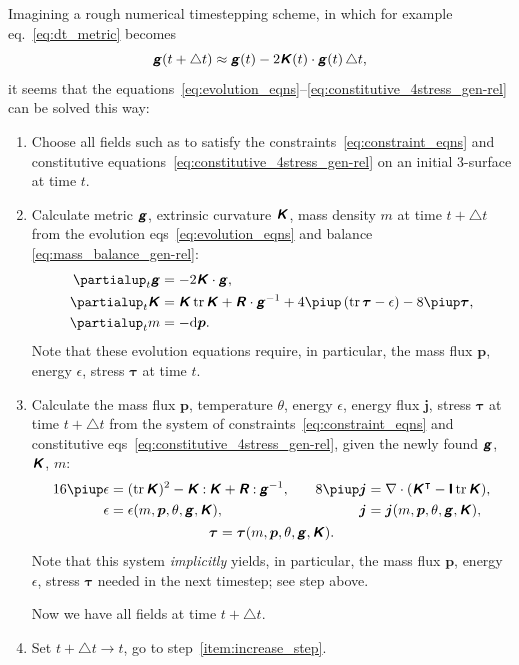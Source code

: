 \documentclass[\ifafour a4paper,12pt,\else a5paper,10pt,\fi%
onecolumn,oneside,article,%
british%
]{memoir}
\theoremstyle{remark}
\theoremstyle{innote}
\newcommand*{\mathte}[1]{\textbf{\textit{\textsf{#1}}}}
\newcommand*{\de}{\partialup}%
\newcommand*{\pu}{\piup}%
\newcommand*{\di}{\mathrm{d}}%
\DeclareMathOperator{\tr}{tr}%
\newcommand*{\incr}{\triangle}%
\newcommand*{\con}{\mathbin{:}}%
\renewcommand*{\|}{\nonscript\,\vert\nonscript\;\mathopen{}}
\newcommand*{\eqn}{eq.}%
\newcommand*{\eqns}{eqs}%
\newcommand*{\T}{^\intercal}%
\newcommand*{\ydd}{m}
\newcommand*{\yd}{\ydd}
\newcommand*{\yjj}{p}
\newcommand*{\yj}{\bm{\yjj}}
\newcommand*{\yTT}{\tau}
\newcommand*{\yT}{\bm{\yTT}}
\newcommand*{\ygg}{g}
\newcommand*{\yg}{\mathte{\ygg}}
\newcommand*{\yKK}{K}
\newcommand*{\yK}{\mathte{\yKK}}
\newcommand*{\yRR}{R}
\newcommand*{\yR}{\mathte{\yRR}}
\newcommand*{\ypp}{j}
\newcommand*{\yp}{\bm{\ypp}}
\newcommand*{\ye}{\epsilon}
\newcommand*{\yte}{\theta}
\newcommand*{\ynab}{\nabla}
\newcommand*{\yto}{t}
\newcommand*{\yI}{\textsf{\textbf{I}}}
\begin{document}
Imagining a rough numerical timestepping scheme, in which for example
\eqn~\eqref{eq:dt_metric} becomes
\begin{equation}
  \label{eq:approx_timestepping_dt_metric}
  \yg(t + \incr t) \approx \yg(t) -2\yK(t)\cdot\yg(t)\,\incr t,
\end{equation}
it seems that the
equations~\eqref{eq:evolution_eqns}--\eqref{eq:constitutive_4stress_gen-rel}
can be solved this way:
\begin{enumerate}[leftmargin=1.5\parindent]
\item Choose all fields such as to satisfy the
  constraints~\eqref{eq:constraint_eqns} and constitutive
  equations~\eqref{eq:constitutive_4stress_gen-rel} on an initial 3-surface
  at time $\yto$.
\item\label{item:increase_step}Calculate metric $\yg$, extrinsic curvature
  $\yK$, mass density $\yd$ at time $\yto + \incr t$ from the evolution
  \eqns~\eqref{eq:evolution_eqns} and balance
  \eqref{eq:mass_balance_gen-rel}:
  \begin{align*}
    \de_t \yg &= -2\yK\cdot\yg,
    \\
    \de_t \yK &=  \yK\tr\yK + \yR\cdot\yg^{-1} + 4\pu\,(\tr\yT-\ye) - 8\pu\yT,
    \\
    \de_t\yd &= - \di\yj.
  \end{align*}
  Note that these evolution equations require, in particular, the mass flux
  $\yj$, energy $\ye$, stress $\yT$ at time $\yto$.
\item\label{item:increase_step_energy}Calculate the mass flux $\yj$,
  temperature $\yte$, energy $\ye$, energy flux $\yp$, stress $\yT$ at time
  $\yto + \incr t$ from the system of
  constraints~\eqref{eq:constraint_eqns} and constitutive
  \eqns~\eqref{eq:constitutive_4stress_gen-rel}, given the newly found
  $\yg$, $\yK$, $\yd$:
  \begin{gather*}
    \begin{aligned}
    16\pu\ye &= (\tr\yK)^2 - \yK\con\yK + \yR\con\yg^{-1},
    &\quad
      8\pu\yp &= \ynab\cdot(\yK\T - \yI\tr\yK),
    \\
    \ye &= \ye(\yd,\yj,\yte,\yg, \yK),
    &
      \yp &= \yp(\yd,\yj,\yte,\yg, \yK),
    \end{aligned}\\
      \yT = \yT(\yd,\yj,\yte,\yg, \yK).
  \end{gather*}
  Note that this system \emph{implicitly} yields, in particular, the mass
  flux $\yj$, energy $\ye$, stress $\yT$ needed in the next timestep; see
  step above.

  Now we have all fields at time $\yto + \incr t$.

\item Set $\yto + \incr t \to \yto$, go to step~\ref{item:increase_step}.
\end{enumerate}
\end{document}
